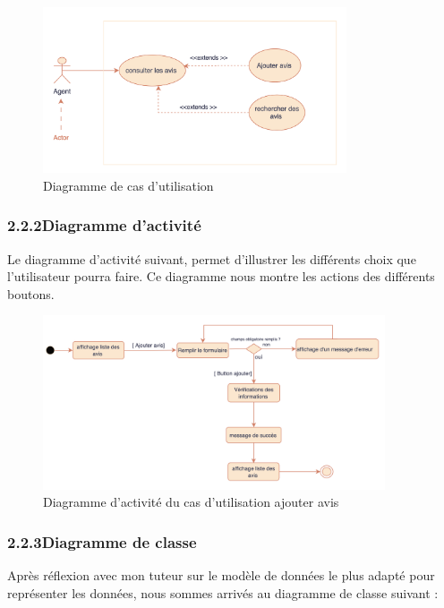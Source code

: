         \begin{figure}[h!]
            \centering
            \includegraphics[width=0.8\textwidth]{images/diagramme/casUtilisation1.png}
            \caption{Diagramme de cas d'utilisation}
        \end{figure}
        \vspace{7cm}

        \subsubsection{2.2.2\hspace{2em}Diagramme d'activité}
        Le diagramme d'activité suivant, permet d'illustrer les différents choix que l'utilisateur pourra faire. Ce diagramme nous montre les actions des différents boutons.
        \medskip

        \begin{figure}[h!]
            \centering
            \includegraphics[width=0.9\textwidth]{images/diagramme/activite.png}
            \caption{Diagramme d'activité du cas d'utilisation ajouter avis}
        \end{figure}
        \medskip

        \subsubsection{2.2.3\hspace{2em}Diagramme de classe}
        Après réflexion avec mon tuteur sur le modèle de données le plus adapté pour représenter les données, nous sommes arrivés au diagramme de classe suivant :
        \vspace{3cm}

